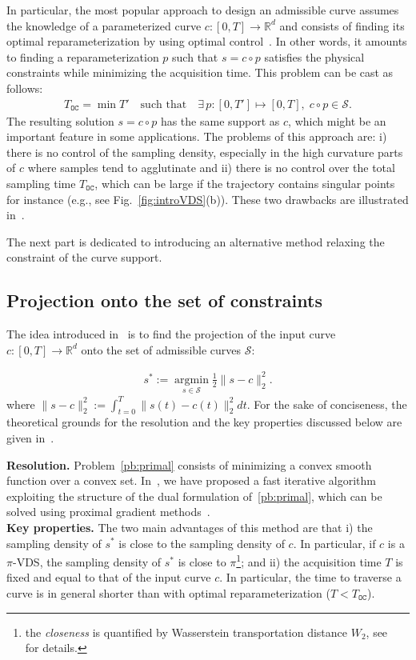 \documentclass{article}
\begin{document}
In particular, the most popular approach to design an admissible curve assumes the knowledge of a parameterized curve $c:[0,T]\to {\mathbb{R}}^d$ and consists of finding its optimal reparameterization by using optimal control~\cite{Lustig08,Vaziri13}. In other words, it amounts to finding a reparameterization $p$ such that $s=c\circ p$ satisfies the physical constraints while minimizing the acquisition time. This problem can be cast as follows:
\begin{align}\label{eq:reparam}
T_{\texttt{OC}}=\min T' \quad \text{such that} \quad \exists\, p:[0,T'] \mapsto [0,T],\; c \circ p \in \mathcal{S}.
\end{align}
The resulting solution $s=c\circ p$ has the same support as $c$, which might be an important feature in some applications.
The problems of this approach are: i) there is no control of the sampling density, especially in the high curvature parts of $c$ where samples tend to agglutinate and ii) there is no control over the total sampling time $T_{\texttt{OC}}$, which can be large if the trajectory contains singular points for instance (e.g., see Fig.~\ref{fig:introVDS}(b)). These two drawbacks are illustrated in~\cite{Chauffert14b}.

The next part is dedicated to introducing an alternative method relaxing the constraint of the curve support.

\subsection{Projection onto the set of constraints}

The idea introduced in~\cite{Chauffert14b} is to find the projection of the input curve $c:[0,T]\to{\mathbb{R}}^d$ onto the set of admissible curves $\mathcal{S}$:

\begin{align}
\label{pb:primal}
s^*:= \underset{s\in \mathcal{S}}{\operatorname{argmin}} \frac{1}{2} \|s-c\|_2^2.
\end{align}
where $\|s-c\|_2^2:=\int_{t=0}^T \|s(t)-c(t)\|_2^2 dt$. For the sake of conciseness, the theoretical grounds for the resolution and the key properties discussed below are given in~\cite{Chauffert14b}.

\noindent\textbf{Resolution.} Problem~\ref{pb:primal} consists of minimizing a convex smooth function over a convex set. In~\cite{Chauffert14b}, we have proposed a fast iterative algorithm exploiting the structure of the dual formulation of~\eqref{pb:primal}, which can be solved using proximal gradient methods~\cite{Combettes11b}.\\
\noindent\textbf{Key properties.}
The two main advantages of this method are that i) the sampling density of $s^*$ is close to the sampling density of $c$. In particular, if $c$ is a $\pi$-VDS, the sampling density of $s^*$ is close to $\pi$\footnote{the \emph{closeness} is quantified by Wasserstein transportation distance $W_2$, see~\cite{Chauffert14b} for details.}; and ii) the acquisition time $T$ is fixed and equal to that of the input curve $c$. In particular, the time to traverse a curve is in general shorter than with optimal reparameterization ($T<T_{\texttt{OC}}$). 
\end{document}
